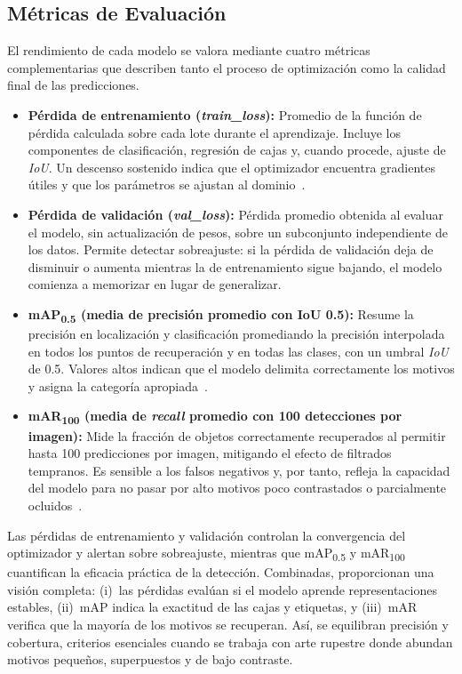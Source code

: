 \subsection{Métricas de Evaluación}

El rendimiento de cada modelo se valora mediante cuatro métricas complementarias que describen tanto el proceso de optimización como la calidad final de las predicciones.

\begin{itemize}
    \item \textbf{Pérdida de entrenamiento (\emph{train\_loss}):}
    Promedio de la función de pérdida calculada sobre cada lote durante el aprendizaje.
    Incluye los componentes de clasificación, regresión de cajas y, cuando procede, ajuste de \emph{IoU}.
    Un descenso sostenido indica que el optimizador encuentra gradientes útiles y que los parámetros se ajustan al dominio~\cite{goodfellow2016deep}.

    \item \textbf{Pérdida de validación (\emph{val\_loss}):}
    Pérdida promedio obtenida al evaluar el modelo, sin actualización de pesos, sobre un subconjunto independiente de los datos.
    Permite detectar sobreajuste: si la pérdida de validación deja de disminuir o aumenta mientras la de entrenamiento sigue bajando, el modelo comienza a memorizar en lugar de generalizar.

    \item \textbf{mAP\textsubscript{0.5} (media de precisión promedio con IoU 0.5):}
    Resume la precisión en localización y clasificación promediando la precisión interpolada en todos los puntos de recuperación y en todas las clases, con un umbral \emph{IoU} de 0.5.
    Valores altos indican que el modelo delimita correctamente los motivos y asigna la categoría apropiada~\cite{lin2014microsoft,everingham2010pascal}.

    \item \textbf{mAR\textsubscript{100} (media de \emph{recall} promedio con 100 detecciones por imagen):}
    Mide la fracción de objetos correctamente recuperados al permitir hasta 100 predicciones por imagen, mitigando el efecto de filtrados tempranos.
    Es sensible a los falsos negativos y, por tanto, refleja la capacidad del modelo para no pasar por alto motivos poco contrastados o parcialmente ocluidos~\cite{cocoEval2015}.
\end{itemize}

Las pérdidas de entrenamiento y validación controlan la convergencia del optimizador y alertan sobre sobreajuste, mientras que mAP\textsubscript{0.5} y mAR\textsubscript{100} cuantifican la eficacia práctica de la detección.
Combinadas, proporcionan una visión completa:
(i)~las pérdidas evalúan si el modelo aprende representaciones estables,
(ii)~mAP indica la exactitud de las cajas y etiquetas, y
(iii)~mAR verifica que la mayoría de los motivos se recuperan.
Así, se equilibran precisión y cobertura, criterios esenciales cuando se trabaja con arte rupestre donde abundan motivos pequeños, superpuestos y de bajo contraste.

